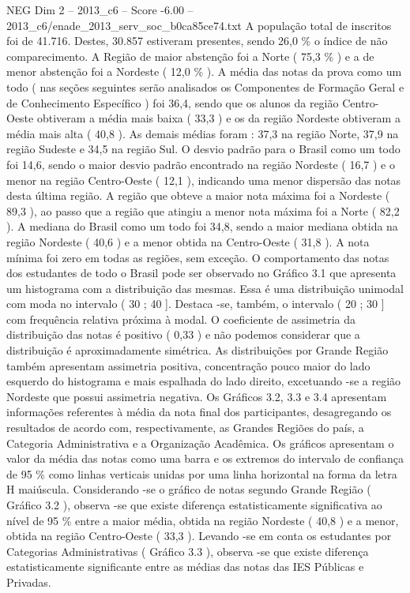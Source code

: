 \begin{textsample}{NEG Dim 2 – 2013\_c6 – Score -6.00 – 2013\_c6/enade\_2013\_serv\_soc\_b0ca85ce74.txt}
A população total de inscritos foi de 41.716.
Destes, 30.857 estiveram presentes, sendo 26,0 \% o índice de não comparecimento.
A Região de maior abstenção foi a Norte ( 75,3 \% ) e a de menor abstenção foi a Nordeste ( 12,0 \% ).
A média das notas da prova como um todo ( nas seções seguintes serão analisados os Componentes de Formação Geral e de Conhecimento Específico ) foi 36,4, sendo que os alunos da região Centro-Oeste obtiveram a média mais baixa ( 33,3 ) e os da região Nordeste obtiveram a média mais alta ( 40,8 ).
As demais médias foram : 37,3 na região Norte, 37,9 na região Sudeste e 34,5 na região Sul.
O desvio padrão para o Brasil como um todo foi 14,6, sendo o maior desvio padrão encontrado na região Nordeste ( 16,7 ) e o menor na região Centro-Oeste ( 12,1 ), indicando uma menor dispersão das notas desta última região.
A região que obteve a maior nota máxima foi a Nordeste ( 89,3 ), ao passo que a região que atingiu a menor nota máxima foi a Norte ( 82,2 ).
A mediana do Brasil como um todo foi 34,8, sendo a maior mediana obtida na região Nordeste ( 40,6 ) e a menor obtida na Centro-Oeste ( 31,8 ).
A nota mínima foi zero em todas as regiões, sem exceção.
O comportamento das notas dos estudantes de todo o Brasil pode ser observado no Gráfico 3.1 que apresenta um histograma com a distribuição das mesmas.
Essa é uma distribuição unimodal com moda no intervalo ( 30 ; 40 ].
Destaca -se, também, o intervalo ( 20 ; 30 ] com frequência relativa próxima à modal.
O coeficiente de assimetria da distribuição das notas é positivo ( 0,33 ) e não podemos considerar que a distribuição é aproximadamente simétrica.
As distribuições por Grande Região também apresentam assimetria positiva, concentração pouco maior do lado esquerdo do histograma e mais espalhada do lado direito, excetuando -se a região Nordeste que possui assimetria negativa.
Os Gráficos 3.2, 3.3 e 3.4 apresentam informações referentes à média da nota final dos participantes, desagregando os resultados de acordo com, respectivamente, as Grandes Regiões do país, a Categoria Administrativa e a Organização Acadêmica.
Os gráficos apresentam o valor da média das notas como uma barra e os extremos do intervalo de confiança de 95 \% como linhas verticais unidas por uma linha horizontal na forma da letra H maiúscula.
Considerando -se o gráfico de notas segundo Grande Região ( Gráfico 3.2 ), observa -se que existe diferença estatisticamente significativa ao nível de 95 \% entre a maior média, obtida na região Nordeste ( 40,8 ) e a menor, obtida na região Centro-Oeste ( 33,3 ).
Levando -se em conta os estudantes por Categorias Administrativas ( Gráfico 3.3 ), observa -se que existe diferença estatisticamente significante entre as médias das notas das IES Públicas e Privadas.

\end{textsample}
